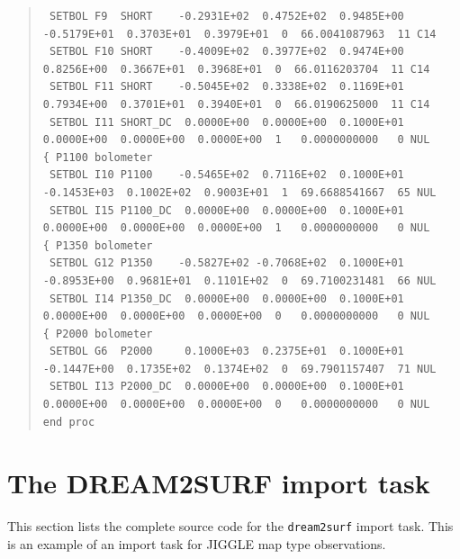 \documentclass[twoside,11pt]{article}
\newenvironment{myquote}{\begin{quote}\begin{small}}{\end{small}\end{quote}}
\renewcommand{\_}{\texttt{\symbol{95}}}
\begin{document}
\begin{landscape}
\begin{myquote}
\begin{verbatim}
 SETBOL F9  SHORT    -0.2931E+02  0.4752E+02  0.9485E+00 -0.5179E+01  0.3703E+01  0.3979E+01  0  66.0041087963  11 C14
 SETBOL F10 SHORT    -0.4009E+02  0.3977E+02  0.9474E+00  0.8256E+00  0.3667E+01  0.3968E+01  0  66.0116203704  11 C14
 SETBOL F11 SHORT    -0.5045E+02  0.3338E+02  0.1169E+01  0.7934E+00  0.3701E+01  0.3940E+01  0  66.0190625000  11 C14
 SETBOL I11 SHORT_DC  0.0000E+00  0.0000E+00  0.1000E+01  0.0000E+00  0.0000E+00  0.0000E+00  1   0.0000000000   0 NUL
{ P1100 bolometer										     		    
 SETBOL I10 P1100    -0.5465E+02  0.7116E+02  0.1000E+01 -0.1453E+03  0.1002E+02  0.9003E+01  1  69.6688541667  65 NUL
 SETBOL I15 P1100_DC  0.0000E+00  0.0000E+00  0.1000E+01  0.0000E+00  0.0000E+00  0.0000E+00  1   0.0000000000   0 NUL
{ P1350 bolometer										     		    
 SETBOL G12 P1350    -0.5827E+02 -0.7068E+02  0.1000E+01 -0.8953E+00  0.9681E+01  0.1101E+02  0  69.7100231481  66 NUL
 SETBOL I14 P1350_DC  0.0000E+00  0.0000E+00  0.1000E+01  0.0000E+00  0.0000E+00  0.0000E+00  0   0.0000000000   0 NUL
{ P2000 bolometer										     		    
 SETBOL G6  P2000     0.1000E+03  0.2375E+01  0.1000E+01 -0.1447E+00  0.1735E+02  0.1374E+02  0  69.7901157407  71 NUL
 SETBOL I13 P2000_DC  0.0000E+00  0.0000E+00  0.1000E+01  0.0000E+00  0.0000E+00  0.0000E+00  0   0.0000000000   0 NUL
end proc
\end{verbatim}
\end{myquote}
\end{landscape}

\section{The DREAM2SURF import task}

This section lists the complete source code for the \texttt{dream2surf} import 
task. This is an example of an import task for JIGGLE map type observations.
\end{document}
